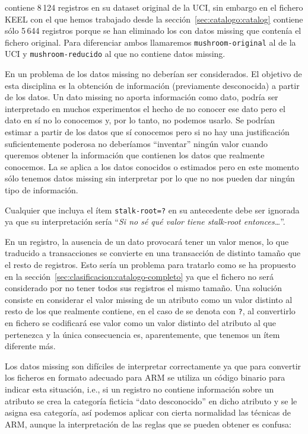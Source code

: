 \ABIERTO
\mushroom contiene 8\,124 registros en su dataset original de la UCI, sin embargo en el fichero KEEL con el que hemos trabajado desde la sección~\ref{sec:catalogo:catalog} contiene sólo 5\,644 registros porque se han eliminado los \registros con datos missing que contenía el fichero original. Para diferenciar ambos \datasets llamaremos \texttt{mushroom-original} al \dataset de la UCI y \texttt{mushroom-reducido} al que no contiene datos missing.

En un problema de \dm los datos missing no deberían ser considerados. El objetivo de esta disciplina es la obtención de información (previamente desconocida) a partir de los datos. Un dato missing no aporta información como dato, podría ser interpretado en muchos experimentos el hecho de no conocer ese dato pero el dato en sí no lo conocemos y, por lo tanto, no podemos usarlo. Se podrían estimar a partir de los datos que sí conocemos pero si no hay una justificación suficientemente poderosa no deberíamos "`inventar"' ningún valor cuando queremos obtener la información que contienen los datos que realmente conocemos. La \dm se aplica a los datos conocidos o estimados pero en este momento sólo tenemos datos missing sin interpretar por lo que no nos pueden dar ningún tipo de información.

Cualquier \ar que incluya el ítem \texttt{stalk-root=?} en su antecedente debe ser ignorada ya que su interpretación sería "`\emph{Si no sé qué valor tiene stalk-root entonces\ldots}"'.

En un registro, la ausencia de un dato provocará tener un valor menos, lo que traducido a transacciones se convierte en una transacción de distinto tamaño que el resto de registros. Esto sería un problema para tratarlo como se ha propuesto en la sección~\ref{sec:clasificacion:catalogo-completo} ya que el fichero \D no será considerado \catalogo por no tener todos sus registros el mismo tamaño. Una solución consiste en considerar el valor missing de un atributo como un valor distinto al resto de los que realmente contiene, en el caso de \mushroom se denota con \texttt{?}, al convertirlo en fichero \D se codificará ese valor como un valor distinto del atributo al que pertenezca y la única consecuencia es, aparentemente, que tenemos un ítem diferente más.

Los datos missing son difíciles de interpretar correctamente ya que para convertir los ficheros en formato adecuado para ARM se utiliza un código binario para indicar esta situación, i.e., si un registro no contiene información sobre un atributo se crea la categoría ficticia "`dato desconocido"' en dicho atributo y se le asigna esa categoría, así podemos aplicar con cierta normalidad las técnicas de ARM, aunque la interpretación de las reglas que se pueden obtener es confusa:

